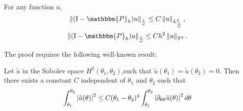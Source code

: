 \documentclass[a4paper]{article}
\begin{document}
\begin{Lem}
	For any function $u$, 
	\[\norm{(\textup{I} - \mathbbm{P}_h)u}_{\frac{1}{\omega}} \leq C\norm{u}_{L^{2}_\frac{1}{\omega}},\]
	\[\norm{(\textup{I} - \mathbbm{P}_h)u}_{\frac{1}{\omega}}  \leq C h^2 \norm{u}_{T^2}.\]
	\label{PhT0T2}
\end{Lem}
\noindent The proof requires the following well-known result:
\begin{Lem}
	\label{LemH2NulAuBord}
	Let $\tilde{u}$ in the Sobolev space $H^2(\theta_1,\theta_2)$,such that $\tilde{u}(\theta_1) = \tilde{u}(\theta_2) = 0$. Then there exists a constant $C$ independent of $\theta_1$ and $\theta_2$ such that 
	\[ \int_{\theta_1}^{\theta_2} \left\lvert \tilde{u}(\theta) \right\rvert^2 \leq C(\theta_1-\theta_2)^4 \int_{\theta_1}^{\theta_2} \left\lvert \partial_{\theta\theta}\tilde{u}(\theta) \right\rvert^2 d\theta\]
\end{Lem}
\end{document}
